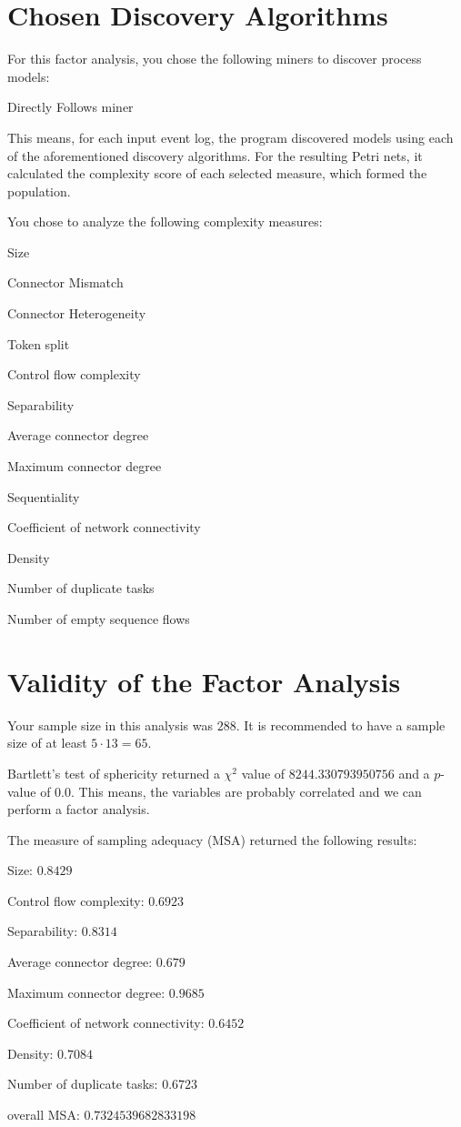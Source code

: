 \documentclass[a4paper]{article}
\begin{document}
\section*{Chosen Discovery Algorithms}
For this factor analysis, you chose the following miners to discover process models:
\begin{compactitem}
\item Directly Follows miner
\end{compactitem}

This means, for each input event log, the program discovered models using each of the aforementioned discovery algorithms.
For the resulting Petri nets, it calculated the complexity score of each selected measure, which formed the population.

You chose to analyze the following complexity measures:
\begin{compactitem}
\item Size
\item Connector Mismatch
\item Connector Heterogeneity
\item Token split
\item Control flow complexity
\item Separability
\item Average connector degree
\item Maximum connector degree
\item Sequentiality
\item Coefficient of network connectivity
\item Density
\item Number of duplicate tasks
\item Number of empty sequence flows
\end{compactitem}

\section*{Validity of the Factor Analysis}
Your sample size in this analysis was $288$.
It is recommended to have a sample size of at least $5 \cdot 13 = 65$.

Bartlett's test of sphericity returned a $\chi^2$ value of $8244.330793950756$ and a $p$-value of $0.0$.
This means, the variables are probably correlated and we can perform a factor analysis.

The measure of sampling adequacy (MSA) returned the following results:
\begin{compactitem}
\item Size: $0.8429$
\item Control flow complexity: $0.6923$
\item Separability: $0.8314$
\item Average connector degree: $0.679$
\item Maximum connector degree: $0.9685$
\item Coefficient of network connectivity: $0.6452$
\item Density: $0.7084$
\item Number of duplicate tasks: $0.6723$
\item overall MSA: $0.7324539682833198$
\end{compactitem}
\end{document}
